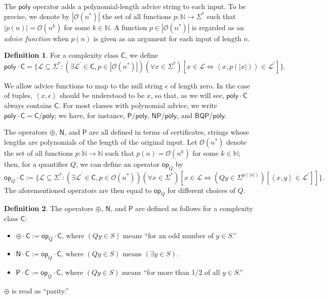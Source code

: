 \documentclass[12pt]{amsart}
\theoremstyle{definition}
\newtheorem*{definition}{Definition}
\theoremstyle{remark}
\newcommand{\N}{\mathbb{N}}
\newcommand{\ra}{\rightarrow}
\newcommand{\cL}{\mathcal{L}}
\newcommand{\sC}{\mathsf{C}}
\newcommand{\NP}{\mathsf{NP}}
\newcommand{\sP}{\mathsf{P}}
\newcommand{\poly}{\mathsf{poly}}
\newcommand{\msf}[1]{\mathsf{#1}}
\newcommand{\Oh}{\mathcal{O}}
\newcommand{\inner}[1]{\left\langle#1\right\rangle}
\newcommand{\op}{\msf{op}}
\newcommand{\sN}{\msf{N}}
\begin{document}
The $\poly$ operator adds a polynomial-length advice string to each input. To be
precise, we denote by $|\Oh(n^*)|$ the set of all functions $p:\N\ra\Sigma^*$
such that $|p(n)|=\Oh(n^k)$ for some $k\in\N$. A function $p\in|\Oh(n^*)|$ is
regarded as an \textit{advice function} when $p(n)$ is given as an argument for
each input of length $n$.
\begin{definition}
For a complexity class $\sC$, we define
\[
  \poly\cdot\sC=\{\cL\subseteq\Sigma^*:(\exists \cL^\prime\in\sC,
  p\in|\Oh(n^*)|)(\forall x\in\Sigma^*)[x\in\cL\Longleftrightarrow
  \inner{x,p(|x|)}\in\cL^\prime]\}.
\]
\end{definition}
We allow advice functions to map to the null string $\epsilon$ of length
zero. In the case of tuples, $\inner{x,\epsilon}$ should be understood to be
$x$, so that, as we will see, $\poly\cdot\sC$ always contains $\sC$. For most
classes with polynomial advice, we write $\poly\cdot\sC=\sC/\poly$; we have, for
instance, $\sP/\poly$, $\NP/\poly$, and $\msf{BQP}/\poly$.

The operators $\oplus$, $\sN$, and $\sP$ are all defined in terms of
certificates, strings whose lengths are polynomials of the length of the
original input. Let $\Oh(n^*)$ denote the set of all functions $p:\N\ra\N$ such
that $p(n)=\Oh(n^k)$ for some $k\in\N$; then, for a quantifier $Q$, we can
define an operator $\op_Q$ by
\[
  \op_Q\cdot\sC:=\{\cL\subseteq\Sigma^*:
  (\exists\cL^\prime\in\sC, p\in\Oh(n^*))(\forall x\in\Sigma^*)
  [x\in\cL\Longleftrightarrow(Qy\in\Sigma^{p(|x|)})[\inner{x,y}\in\cL^\prime]]\}.
\]
The aforementioned operators are then equal to $\op_Q$ for different choices of
$Q$.
\begin{definition}
The operators $\oplus$, $\sN$, and $\sP$ are defined as follows for a
complexity class $\sC$:
\begin{itemize}
\item $\oplus\cdot\sC:=\op_Q\cdot\sC$, where $(Qy\in S)$ means ``for an odd
  number of $y\in S$.''
\item $\sN\cdot\sC:=\op_Q\cdot\sC$, where $(Qy\in S)$ means $(\exists y\in S)$.
\item $\sP\cdot\sC:=\op_Q\cdot\sC$, where $(Qy\in S)$ means ``for more than 1/2
  of all $y\in S$.''
\end{itemize}
$\oplus$ is read as ``parity.''
\end{definition}
\end{document}
